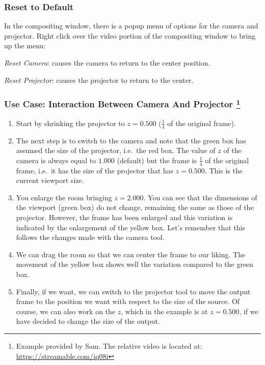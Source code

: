 \subsubsection*{Reset to Default}%
\label{ssub:reset_default}

In the compositing window, there is a popup menu of options for the camera and projector. Right click over the video portion of the compositing window to bring up the menu:

\textit{Reset Camera}: causes the camera to return to the center position.
    	
\textit{Reset Projector}: causes the projector to return to the center.

\subsubsection*{Use Case: Interaction Between Camera And Projector \protect\footnote{Example provided by Sam. The relative video is located at: \url{https://streamable.com/iq08i}}}%
\label{ssub:use_case_interaction_camera_projector}

\begin{enumerate}
    \item Start by shrinking the projector to $z=0.500$ ($\frac{1}{4}$ of the original frame).
    \item The next step is to switch to the camera and note that the green box has assumed the size of the projector, i.e.\ the red box. The value of $z$ of the camera is always equal to $1.000$ (default) but the frame is $\frac{1}{4}$ of the original frame, i.e.\ it has the size of the projector that has $z=0.500$. This is the current viewport size.
    \item You enlarge the room bringing $z=2.000$. You can see that the dimensions of the viewport (green box) do not change, remaining the same as those of the projector. However, the frame has been enlarged and this variation is indicated by the enlargement of the yellow box. Let's remember that this follows the changes made with the camera tool.
    \item We can drag the room so that we can center the frame to our liking. The movement of the yellow box shows well the variation compared to the green box.
    \item Finally, if we want, we can switch to the projector tool to move the output frame to the position we want with respect to the size of the source. Of course, we can also work on the $z$, which in the example is at $z=0.500$, if we have decided to change the size of the output.
\end{enumerate}

